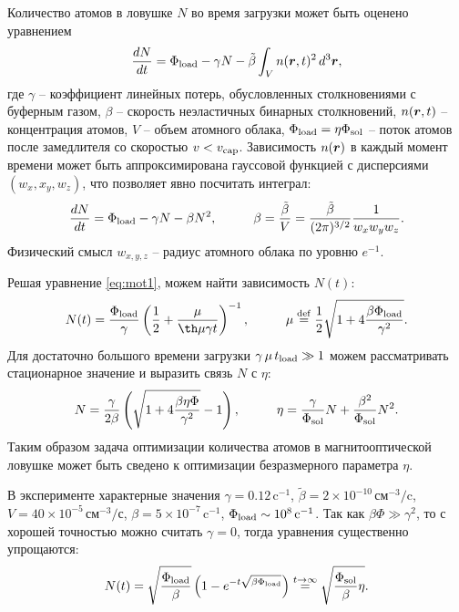 {}
Количество атомов в ловушке $N$ во время загрузки может быть оценено уравнением \cite{vlad}
\begin{equation}
	\frac{d N}{d t} = \Phi_{\textnormal{load}} - \gamma N - \tilde{\beta} \int_V n(\boldsymbol{r}, t)^2 \, d^3 \boldsymbol{r},
\end{equation}
где $\gamma$ -- коэффициент линейных потерь, обусловленных столкновениями с буферным газом, $\beta$ -- скорость неэластичных бинарных столкновений, $n(\boldsymbol{r}, t)$ -- концентрация атомов, $V$ -- объем атомного облака, $\Phi_{\textnormal{load}} = \eta \Phi_{\textnormal{sol}}$ -- поток атомов после замедлителя со скоростью $v < v_{\textnormal{cap}}$. Зависимость $n(\boldsymbol{r})$ в каждый момент времени может быть аппроксимирована гауссовой функцией с дисперсиями $(w_x, x_y, w_z)$, что позволяет явно посчитать интеграл:
\begin{equation}
	\frac{d N}{d t}  = \sub{\Phi}{load}  - \gamma N - \beta N^2,
	\hspace{10 mm} 
	\beta = \frac{\tilde{\beta}}{V} = \frac{\tilde{\beta}}{(2\pi)^{3/2}} \frac{1}{w_x w_y w_z} .
	\label{eq:mot1}
\end{equation}
Физический смысл $w_{x, y,z}$ -- радиус атомного облака по уровню $e^{-1}$.

Решая уравнение \eqref{eq:mot1}, можем найти зависимость $N(t)$:
\begin{equation}
	N(t) = \frac{\sub{\Phi}{load}}{\gamma} \left(
		\frac{1}{2} + \frac{\mu}{\th \mu \gamma t }
	\right)^{-1}
	,
	\hspace{10 mm} 
	\mu \overset{\mathrm{def}}{=}  \frac{1}{2} \sqrt{1 + 4 \frac{\beta \sub{\Phi}{load}}{\gamma^2}}.
\end{equation}
Для достаточно большого времени загрузки $\gamma\, \mu\,  t_{\textnormal{load}} \gg 1$ можем рассматривать стационарное значение и выразить связь $N$ с $\eta$:
\begin{equation}
	N = \frac{\gamma}{2\beta}
	\left(\sqrt{1 + 4 \frac{\beta \eta \Phi}{\gamma^2}}-1\right),
	\hspace{10mm} 
	\eta = \frac{\gamma}{\sub{\Phi}{sol}} N + \frac{\beta^2}{\sub{\Phi}{sol}} N^2.
	\label{eq:etaN}
\end{equation}
Таким образом задача оптимизации количества атомов в магнитооптической ловушке может быть сведено к оптимизации безразмерного параметра $\eta$.  


В эксперименте характерные значения \cite{vlad} $\gamma = 0.12\,\text{c}^{-1}$, $\tilde{\beta}=2\times10^{-10}\,\text{см}^{-3}/\text{c}$, $V=40\times 10^{-5}\, \text{см}^{-3}/\text{с}$, $\beta = 5\times 10^{-7}\,\text{c}^{-1}$, $\Phi_{\textnormal{load}} \sim 10^8\,\text{c}^{-1}$. Так как $\beta \Phi \gg \gamma^2$, то с хорошей точностью можно считать $\gamma=0$, тогда уравнения существенно упрощаются:
\begin{equation}
	N(t) = \sqrt{\frac{\Phi_{\textnormal{load}}}{\beta}} \left(1-e^{-t \sqrt{\beta \Phi_{\textnormal{load}}}}\right) \overset{t\to\infty}{=} \sqrt{\frac{\Phi_{\textnormal{sol}}}{\beta}\eta}.
	\label{eq:Ntd}
\end{equation}